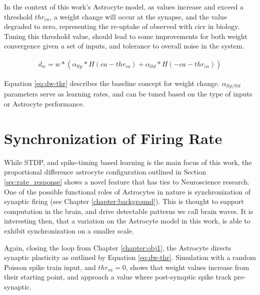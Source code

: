 In the context of this work's Astrocyte model, as \ca values increase and exceed
a threshold $thr_{ca}$, a weight change will occur at the synapse, and the \ca
value degraded to zero, representing the re-uptake of \ca observed with \Gls{cicr} in
biology. Tuning this threshold value, should lead to some improvements for both
weight convergence given a set of inputs, and tolerance to overall noise in the
system.

\begin{align}
  d_w = w * (\alpha_{ltp} * H(ca - thr_{ca}) + \alpha_{ltd} * H(-ca - thr_{ca}))  \label{eq:dw-thr}
\end{align}

Equation \ref{eq:dw-thr} describes the baseline concept for weight
change. $\alpha_{ltp/ltd}$ parameters serve as learning rates, and can be tuned
based on the type of inputs or Astrocyte performance.


\section{Synchronization of Firing Rate}
While STDP, and spike-timing based learning is the main focus of this work, the
proportional difference astrocyte configuration outlined in Section
\ref{sec:rate_response} shows a novel feature that has ties to Neuroscience
research. One of the possible functional roles of Astrocytes in nature is
synchronization of synaptic firing (see Chapter \ref{chapter:background}). This
is thought to support computation in the brain, and drive detectable patterns we
call brain waves. It is interesting then, that a variation on the Astrocyte
model in this work, is able to exhibit synchronization on a smaller scale.

Again, closing the loop from Chapter \ref{chapter:obj1}, the Astrocyte directs
synaptic plasticity as outlined by Equation \ref{eq:dw-thr}. Simulation with a
random Poisson spike train input, and $thr_{ca}=0$, shows that weight values
increase from their starting point, and approach a value where post-synaptic
spike track pre-synaptic.



